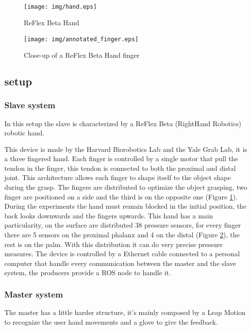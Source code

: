\begin{figure}
  \centering
    \texttt{[image: img/hand.eps]}
  \caption{ReFlex Beta Hand}
  \label{fig:hand}
\end{figure}

\begin{figure}
  \centering
    \texttt{[image: img/annotated\_finger.eps]}
  \caption{Close-up of a ReFlex Beta Hand finger}
  \label{fig:finger}
\end{figure}



\subsection{setup}

\subsubsection{Slave system}

In this setup the slave is characterized by a ReFlex Beta (RightHand Robotics) robotic hand. 

This device is made by the Harvard Biorobotics Lab and the Yale Grab Lab, it is a three fingered hand. Each finger is controlled by a single motor that pull the tendon in the finger, this tendon is connected to both the proximal and distal joint. This architecture allows each finger to shape itself to the object shape during the grasp. The fingers are distributed to optimize the object grasping, two finger are positioned on a side and the third is on the opposite one (Figure \ref{fig:hand}). 
During the experiments the hand must remain blocked in the initial position, the back looks downwards and the fingers upwards. 
This hand has a main particularity, on the surface are distributed 38 pressure sensors, for every finger there are 5 sensors on the proximal phalanx and 4 on the distal (Figure \ref{fig:finger}), the rest is on the palm. With this distribution it can do very precise pressure measures. 
The device is controlled by a Ethernet cable connected to a personal computer that handle every communication between the master and the slave system, the producers provide a ROS node to handle it.

\subsubsection{Master system}

The master has a little harder structure, it's mainly composed by a Leap Motion to recognize the user hand movements and a glove to give the feedback.

